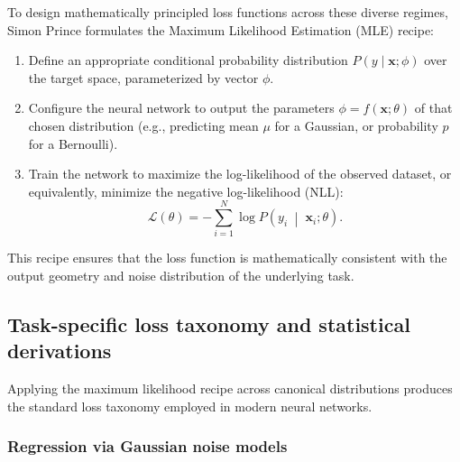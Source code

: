 \documentclass[../../main.tex]{subfiles}
\begin{document}
To design mathematically principled loss functions across these diverse regimes, Simon Prince \citep{prince2023udl} formulates the Maximum Likelihood Estimation (MLE) recipe:
\begin{enumerate}[label=Step \arabic*:]
    \item Define an appropriate conditional probability distribution $P(y \mid \mathbf{x}; \phi)$ over the target space, parameterized by vector $\phi$.
    \item Configure the neural network to output the parameters $\phi = f(\mathbf{x}; \theta)$ of that chosen distribution (e.g., predicting mean $\mu$ for a Gaussian, or probability $p$ for a Bernoulli).
    \item Train the network to maximize the log-likelihood of the observed dataset, or equivalently, minimize the negative log-likelihood (NLL):
    \begin{equation}
    \mathcal{L}(\theta) = -\sum_{i=1}^N \log P\left(y_i \;\middle|\; \mathbf{x}_i; \theta\right).
    \end{equation}
\end{enumerate}
This recipe ensures that the loss function is mathematically consistent with the output geometry and noise distribution of the underlying task.

\subsection{Task-specific loss taxonomy and statistical derivations}
\label{subsec:loss_taxonomy_mle}

Applying the maximum likelihood recipe across canonical distributions produces the standard loss taxonomy employed in modern neural networks.

\subsubsection{Regression via Gaussian noise models}
\end{document}
